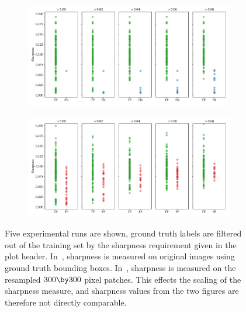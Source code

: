 \begin{figure}[htbp]
  \centering
  \begin{subfigure}[t]{\textwidth}
    \includegraphics[width=\textwidth]{figs/results/sharpness/sharpness_TP_vs_FN.pdf}
    \label{fig:results-sharpness-gt}
  \end{subfigure}
  \begin{subfigure}[t]{\textwidth}
    \includegraphics[width=\textwidth]{figs/results/sharpness/detection_sharpness_TP_vs_FP.pdf}
    \label{fig:results-sharpness-detections}
  \end{subfigure}
  \caption[Sharpness distribution of model predictions in test split by minimum training sharpness]{%
  Five experimental runs are shown, ground truth labels are filtered out of the training set by the sharpness requirement given in the plot header. In~, sharpness is measured on original images using ground truth bounding boxes. In~, sharpness is measured on the resampled \(300\by300\) pixel patches. This effects the scaling of the sharpness measure, and sharpness values from the two figures are therefore not directly comparable.}
\end{figure}

